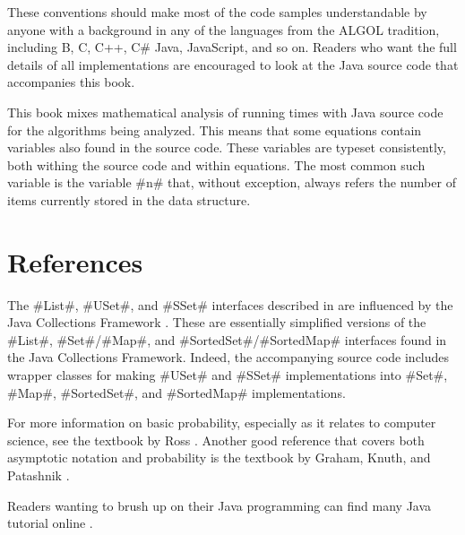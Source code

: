 These conventions should make most of the code samples understandable by
anyone with a background in any of the languages from the ALGOL tradition,
including B, C, C++, C\# Java, JavaScript, and so on.  Readers who want
the full details of all implementations are encouraged to look at the
Java source code that accompanies this book.

This book mixes mathematical analysis of running times with Java source
code for the algorithms being analyzed.  This means that some equations
contain variables also found in the source code.  These variables are
typeset consistently, both withing the source code and within equations.
The most common such variable is the variable #n# that, without exception,
always refers the number of items currently stored in the data structure.

\section{References}

The #List#, #USet#, and #SSet# interfaces described in 
are influenced by the Java Collections Framework
\cite{oracle_collections}.  These are essentially simplified versions of
the #List#, #Set#/#Map#, and #SortedSet#/#SortedMap# interfaces found in
the Java Collections Framework.  Indeed, the accompanying source code
includes wrapper classes for making #USet# and #SSet# implementations
into #Set#, #Map#, #SortedSet#, and #SortedMap# implementations.

For more information on basic probability, especially as it relates to
computer science, see the textbook by Ross \cite{r01}.  Another good
reference that covers both asymptotic notation and probability is the
textbook by Graham, Knuth, and Patashnik \cite{gkp94}.

Readers wanting to brush up on their Java programming can find many Java
tutorial online \cite{oracle_tutorials}.




